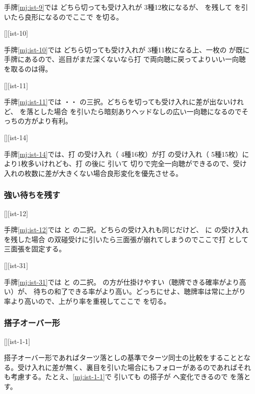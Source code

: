 \documentclass[10pt, twocolumn]{article}
\begin{document}
手牌\ref{mj:ist-9}では  どちら切っても受け入れが  3種12枚になるが、 を残して  を引いたら良形になるのでここで  を切る。

[][ist-10]

手牌\ref{mj:ist-10}では  どちら切っても受け入れが  3種11枚になる上、一枚の  が既に手牌にあるので、巡目がまだ深くないなら打  で両向聴に戻ってよりいい一向聴を取るのは得。

[][ist-11]

手牌\ref{mj:ist-11}では ・・ の三択。どちらを切っても受け入れに差が出ないけれど、 を落とした場合  を引いたら暗刻ありヘッドなしの広い一向聴になるのでそっちの方がより有利。

[][ist-14]

手牌\ref{mj:ist-14}では、打  の受け入れ（ 4種16枚）が打  の受け入れ（ 5種15枚）により1枚多いけれども、打  の後に  引いて  切りで完全一向聴ができるので、受け入れの枚数に差が大きくない場合良形変化を優先させる。

\subsubsection*{強い待ちを残す}

[][ist-12]

手牌\ref{mj:ist-12}では  と  の二択。どちらの受け入れも同じだけど、 に  の受け入れを残した場合  の双碰受けに引いたら三面張が崩れてしまうのでここで打  として三面張を固定する。

[][ist-31]

手牌\ref{mj:ist-31}では  と  の二択。 の方が仕掛けやすい（聴牌できる確率がより高い）が、 待ちの和了できる率がより高い。どっちにせよ、聴牌率は常に上がり率より高いので、上がり率を重視してここで  を切る。

\subsubsection*{搭子オーバー形}

[][ist-1-1]

搭子オーバー形であればターツ落としの基準でターツ同士の比較をすることとなる\citep{gendai-iishanten-yojouhai}。受け入れに差が無く、裏目を引いた場合にもフォローがあるのであればそれも考慮する。たとえ、\ref{mj:ist-1-1}で  引いても  の搭子が  へ変化できるので  を落とす。
\end{document}
